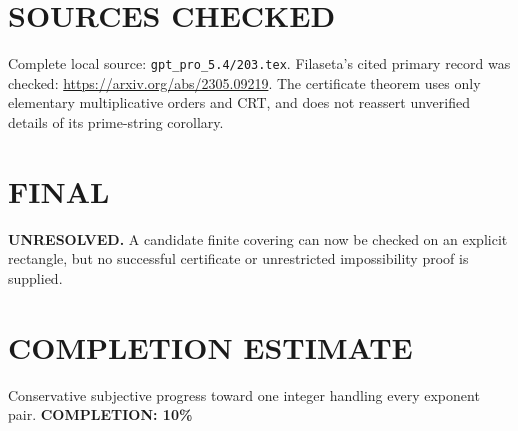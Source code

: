\section{SOURCES CHECKED}
Complete local source: \texttt{gpt\_pro\_5.4/203.tex}. Filaseta's cited primary record was checked: \url{https://arxiv.org/abs/2305.09219}. The certificate theorem uses only elementary multiplicative orders and CRT, and does not reassert unverified details of its prime-string corollary.
\section{FINAL}
\textbf{UNRESOLVED.} A candidate finite covering can now be checked on an explicit rectangle, but no successful certificate or unrestricted impossibility proof is supplied.
\section{COMPLETION ESTIMATE}
Conservative subjective progress toward one integer handling every exponent pair.
\textbf{COMPLETION: 10\%}
